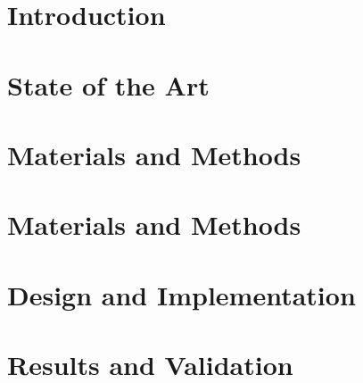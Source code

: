 \documentclass[a4paper,oneside,12pt]{book}
\begin{document}




\tableofcontents
\listoffigures
\listoftables
\pagebreak

\chapter{Introduction}
\chapter{State of the Art}


\chapter{Materials and Methods}
  

\chapter{Materials and Methods}
  


\chapter{Design and Implementation}


\chapter{Results and Validation}



\begin{footnotesize}
\cleardoublepage
{}


\end{footnotesize}
\end{document}
